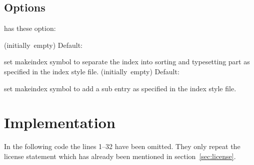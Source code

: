 \documentclass{cnpkgdoc}
\newcommand*\Default[1]{%
  \hfill\llap
    {%
      \ifblank{#1}%
        {(initially~empty)}%
        {Default:~\code{#1}}%
    }%
  \newline
}
\begin{document}
\subsection{Options}
\idxcmds has these option:
\begin{beschreibung}
 \Default{@}
   set makeindex symbol to separate the index into sorting and typesetting part
   as specified in the index style file.
 \Default{!}
   set makeindex symbol to add a sub entry as specified in the index style file.
\end{beschreibung}

\printbibliography

\section{Implementation}
In the following code the lines 1--32 have been omitted. They only repeat the
license statement which has already been mentioned in section~\ref{sec:license}.

\implementation[linerange={33-1000},firstnumber=33]

{}
\printindex
\clearpage
\printindex[examples]
\end{document}

